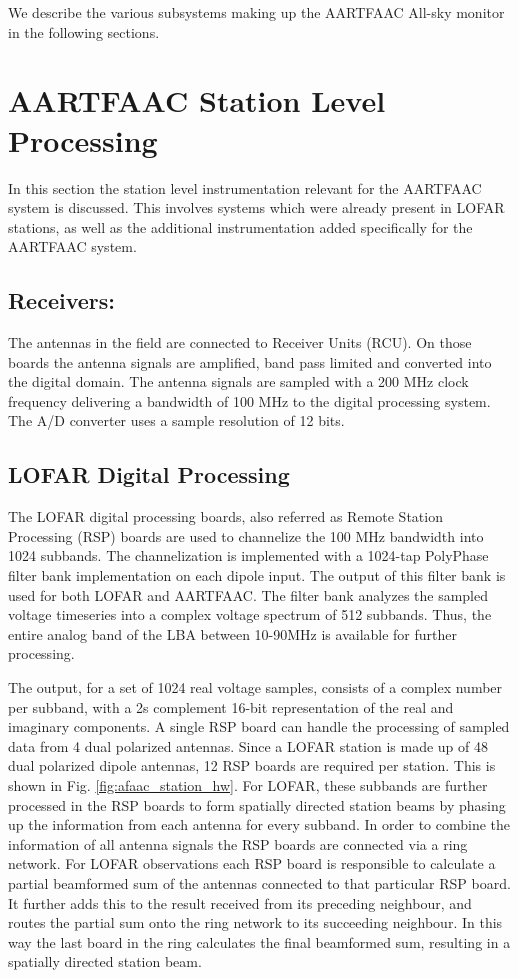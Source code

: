 \documentclass{ws-jai}
\begin{document}
We describe the various subsystems making up the AARTFAAC All-sky monitor in the
following sections.

\section {\label{sec:station_hardware} AARTFAAC Station Level Processing}
In  this section  the station  level instrumentation  relevant for  the AARTFAAC
system is discussed.  This involves systems which were already  present in LOFAR
stations, as well  as the additional instrumentation added  specifically for the
AARTFAAC system.
\subsection {Receivers:}  The  antennas  in the  field  are connected  to
Receiver Units  (RCU). On those boards  the antenna signals are  amplified, band
pass limited  and converted  into the  digital domain.  The antenna  signals are
sampled with a 200 MHz clock frequency  delivering a bandwidth of 100 MHz to the
digital processing system. The A/D converter uses a sample resolution of 12 bits.

\subsection  {LOFAR Digital  Processing}  The  LOFAR digital  processing
boards, also  referred as  Remote Station  Processing (RSP)  boards are  used to
channelize  the 100  MHz bandwidth  into  1024 subbands.  The channelization  is
implemented with a 1024-tap PolyPhase  filter bank implementation on each dipole
input. The output of  this filter bank is used for both  LOFAR and AARTFAAC. The
filter  bank analyzes  the sampled  voltage  timeseries into  a complex  voltage
spectrum  of 512  subbands. Thus,  the  entire analog  band of  the LBA  between
10-90MHz is available for further processing.

The output, for a set of 1024 real voltage samples, consists of a complex number
per  subband,  with a  2s  complement  16-bit  representation  of the  real  and
imaginary components.  A  single RSP board can handle the  processing of sampled
data from 4 dual polarized antennas. Since a LOFAR station is made up of 48 dual
polarized dipole antennas, 12 RSP boards are required per station. This is shown
in  Fig.  \ref{fig:afaac_station_hw}.   For  LOFAR, these  subbands are  further
processed in the RSP boards to  form spatially directed station beams by phasing
up the information from each antenna for  every subband. In order to combine the
information  of all  antenna signals  the RSP  boards are  connected via  a ring
network. For  LOFAR observations each  RSP board  is responsible to  calculate a
partial  beamformed  sum  of  the  antennas connected  to  that  particular  RSP
board.  It  further  adds  this  to the  result  received  from  its  preceding
neighbour, and  routes the partial sum  onto the ring network  to its succeeding
neighbour.  In  this  way the  last  board  in  the  ring calculates  the  final
beamformed sum, resulting in a spatially directed station beam.
\end{document}
